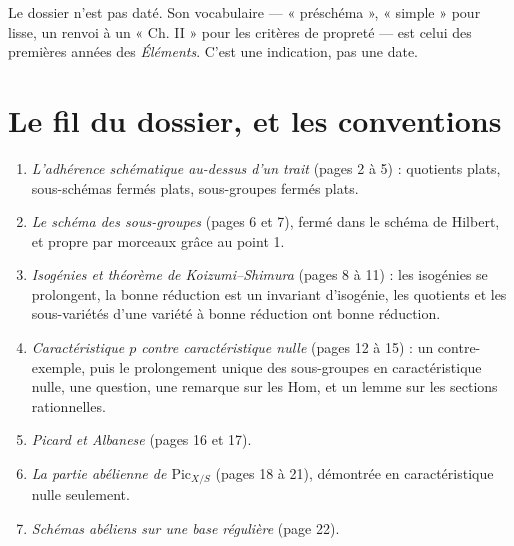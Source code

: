 \documentclass[11pt,a4paper]{article}
\begin{document}
\begin{resume}
Le dossier n'est pas daté. Son vocabulaire --- « préschéma », « simple » pour
lisse, un renvoi à un « Ch. II » pour les critères de propreté --- est celui des
premières années des \emph{Éléments}. C'est une indication, pas une date.

\end{resume}

\section*{Le fil du dossier, et les conventions}

\begin{enumerate}
\item[1.] \emph{L'adhérence schématique au-dessus d'un trait} (pages 2 à 5) :
quotients plats, sous-schémas fermés plats, sous-groupes fermés plats.
\item[2.] \emph{Le schéma des sous-groupes} (pages 6 et 7), fermé dans le
schéma de Hilbert, et propre par morceaux grâce au point 1.
\item[3.] \emph{Isogénies et théorème de Koizumi--Shimura} (pages 8 à 11) : les
isogénies se prolongent, la bonne réduction est un invariant d'isogénie, les
quotients et les sous-variétés d'une variété à bonne réduction ont bonne
réduction.
\item[4.] \emph{Caractéristique $p$ contre caractéristique nulle} (pages 12 à
15) : un contre-exemple, puis le prolongement unique des sous-groupes en
caractéristique nulle, une question, une remarque sur les $\mathrm{Hom}$, et un
lemme sur les sections rationnelles.
\item[5.] \emph{Picard et Albanese} (pages 16 et 17).
\item[6.] \emph{La partie abélienne de $\mathrm{Pic}_{X/S}$} (pages 18 à 21),
démontrée en caractéristique nulle seulement.
\item[7.] \emph{Schémas abéliens sur une base régulière} (page 22).
\end{enumerate}
\end{document}
